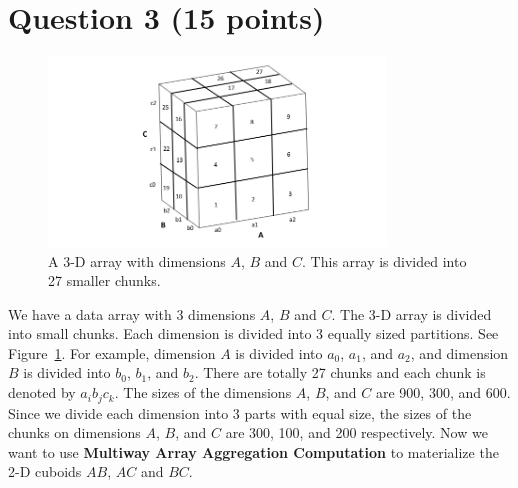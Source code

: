 \section*{Question 3 (15 points)}
\begin{figure}[t]
\includegraphics[width=0.8\textwidth]{Figures/fig-chunk.png}
\centering
\caption{A 3-D array with dimensions $A$, $B$ and $C$. This array is divided into 27 smaller chunks.}
\label{fig:chunk}
\end{figure}
We have a data array with 3 dimensions $A$, $B$ and $C$. The 3-D array is divided into small chunks. Each dimension is divided into 3 equally sized partitions. See Figure~\ref{fig:chunk}. For example, dimension $A$ is divided into $a_0$, $a_1$, and $a_2$, and dimension $B$ is divided into $b_0$, $b_1$, and $b_2$. There are totally 27 chunks and each chunk is denoted by $a_ib_jc_k$. The sizes of the dimensions $A$, $B$, and $C$ are 900, 300, and 600. Since we divide each dimension into 3 parts with equal size, the sizes of the chunks on dimensions $A$, $B$, and $C$ are 300, 100, and 200 respectively. Now we want to use \textbf{Multiway Array Aggregation Computation} to materialize the 2-D cuboids $AB$, $AC$ and $BC$.\\


